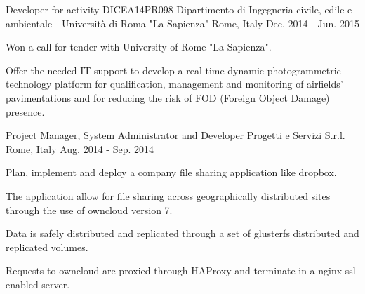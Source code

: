 \begin{cventries}
  \cventry
    {Developer for activity DICEA14PR098} %
    {Dipartimento di Ingegneria civile, edile e ambientale - Università di Roma "La Sapienza"} %
    {Rome, Italy} %
    {Dec. 2014 - Jun. 2015} %
    {
      \begin{cvitems} %
        \item {Won a call for tender with University of Rome "La Sapienza".}
        \item {Offer the needed IT support to develop a real time dynamic photogrammetric technology platform for qualification, management and monitoring of airfields' pavimentations and for reducing the risk of FOD (Foreign Object Damage) presence.}
      \end{cvitems}
    }

  \cventry
    {Project Manager, System Administrator and Developer} %
    {Progetti e Servizi S.r.l.} %
    {Rome, Italy} %
    {Aug. 2014 - Sep. 2014} %
    {
      \begin{cvitems} %
        \item {Plan, implement and deploy a company file sharing application like dropbox.}
        \item {The application allow for file sharing across geographically distributed sites through the use of owncloud version 7.}
        \item {Data is safely distributed and replicated through a set of glusterfs distributed and replicated volumes.}
        \item {Requests to owncloud are proxied through HAProxy and terminate in a nginx ssl enabled server.}
      \end{cvitems}
    }


\end{cventries}
